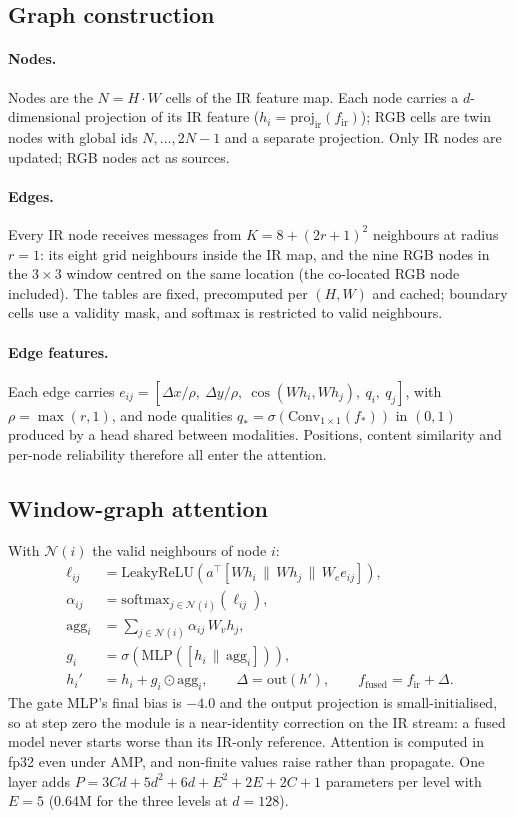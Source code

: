 \documentclass[10pt,twocolumn,letterpaper]{article}
\begin{document}
\subsection{Graph construction}
\paragraph{Nodes.} Nodes are the $N=H\cdot W$ cells of the IR feature map.
Each node carries a $d$-dimensional projection of its IR feature
($h_i=\mathrm{proj}_{\mathrm{ir}}(f_{\mathrm{ir}})$); RGB cells are twin nodes
with global ids $N,\dots,2N-1$ and a separate projection. Only IR nodes are
updated; RGB nodes act as sources.

\paragraph{Edges.} Every IR node receives messages from $K=8+(2r+1)^2$
neighbours at radius $r=1$: its eight grid neighbours inside the IR map, and
the nine RGB nodes in the $3\times3$ window centred on the same location
(the co-located RGB node included). The tables are fixed, precomputed per
$(H,W)$ and cached; boundary cells use a validity mask, and softmax is
restricted to valid neighbours.

\paragraph{Edge features.} Each edge carries
$e_{ij}=[\Delta x/\rho,\ \Delta y/\rho,\ \cos(W h_i, W h_j),\ q_i,\ q_j]$,
with $\rho=\max(r,1)$, and node qualities
$q_\ast=\sigma(\mathrm{Conv}_{1\times1}(f_\ast))$ in $(0,1)$ produced by a
head shared between modalities. Positions, content similarity and per-node
reliability therefore all enter the attention.

\subsection{Window-graph attention}
With $\mathcal{N}(i)$ the valid neighbours of node $i$:
\begin{align}
\ell_{ij} &= \mathrm{LeakyReLU}\!\left(a^{\top}[Wh_i\,\|\,Wh_j\,\|\,W_e e_{ij}]\right),\\
\alpha_{ij} &= \mathrm{softmax}_{j\in\mathcal{N}(i)}(\ell_{ij}),\\
\mathrm{agg}_i &= \sum_{j\in\mathcal{N}(i)} \alpha_{ij}\, W_v h_j,\\
g_i &= \sigma\!\left(\mathrm{MLP}([h_i\,\|\,\mathrm{agg}_i])\right),\\
h_i' &= h_i + g_i\odot \mathrm{agg}_i,\qquad
\Delta = \mathrm{out}(h'),\qquad f_{\text{fused}} = f_{\mathrm{ir}} + \Delta .
\end{align}
The gate MLP's final bias is $-4.0$ and the output projection is
small-initialised, so at step zero the module is a near-identity correction on
the IR stream: a fused model never starts worse than its IR-only reference.
Attention is computed in fp32 even under AMP, and non-finite values raise
rather than propagate. One layer adds
$P=3Cd+5d^2+6d+E^2+2E+2C+1$ parameters per level with $E=5$ (0.64M for the
three levels at $d{=}128$).
\end{document}
